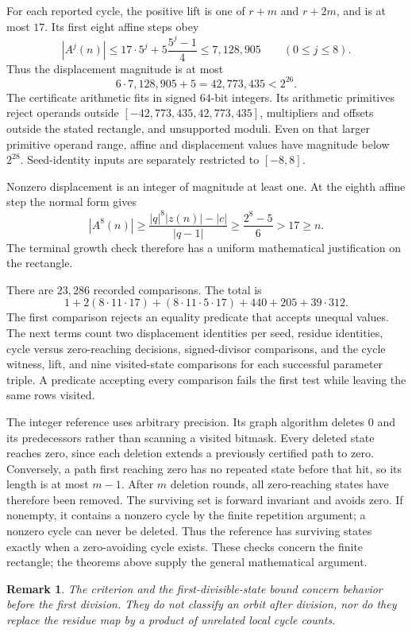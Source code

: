 \documentclass[11pt,letterpaper]{article}
\newtheorem{remark}[theorem]{Remark}
\begin{document}
For each reported cycle, the positive lift is one of \(r+m\) and \(r+2m\), and is at most \(17\). Its first eight affine steps obey
\[
  |A^j(n)|\le17\cdot5^j+5\frac{5^j-1}{4}\le7{,}128{,}905
  \qquad (0\le j\le8).
\]
Thus the displacement magnitude is at most
\[
  6\cdot7{,}128{,}905+5=42{,}773{,}435<2^{26}.
\]
The certificate arithmetic fits in signed \(64\)-bit integers. Its arithmetic primitives reject operands outside \([-42{,}773{,}435,42{,}773{,}435]\), multipliers and offsets outside the stated rectangle, and unsupported moduli. Even on that larger primitive operand range, affine and displacement values have magnitude below \(2^{28}\). Seed-identity inputs are separately restricted to \([-8,8]\).

Nonzero displacement is an integer of magnitude at least one. At the eighth affine step the normal form gives
\[
  |A^8(n)|\ge\frac{|q|^8|z(n)|-|c|}{|q-1|}
  \ge\frac{2^8-5}{6}>17\ge n.
\]
The terminal growth check therefore has a uniform mathematical justification on the rectangle.

There are \(23{,}286\) recorded comparisons. The total is
\[
  1+2(8\cdot11\cdot17)+(8\cdot11\cdot5\cdot17)+440+205+39\cdot312.
\]
The first comparison rejects an equality predicate that accepts unequal values. The next terms count two displacement identities per seed, residue identities, cycle versus zero-reaching decisions, signed-divisor comparisons, and the cycle witness, lift, and nine visited-state comparisons for each successful parameter triple. A predicate accepting every comparison fails the first test while leaving the same rows visited.

The integer reference uses arbitrary precision. Its graph algorithm deletes \(0\) and its predecessors rather than scanning a visited bitmask. Every deleted state reaches zero, since each deletion extends a previously certified path to zero. Conversely, a path first reaching zero has no repeated state before that hit, so its length is at most \(m-1\). After \(m\) deletion rounds, all zero-reaching states have therefore been removed. The surviving set is forward invariant and avoids zero. If nonempty, it contains a nonzero cycle by the finite repetition argument; a nonzero cycle can never be deleted. Thus the reference has surviving states exactly when a zero-avoiding cycle exists. These checks concern the finite rectangle; the theorems above supply the general mathematical argument.

\begin{remark}
The criterion and the first-divisible-state bound concern behavior before the first division. They do not classify an orbit after division, nor do they replace the residue map by a product of unrelated local cycle counts.
\end{remark}



\end{document}
